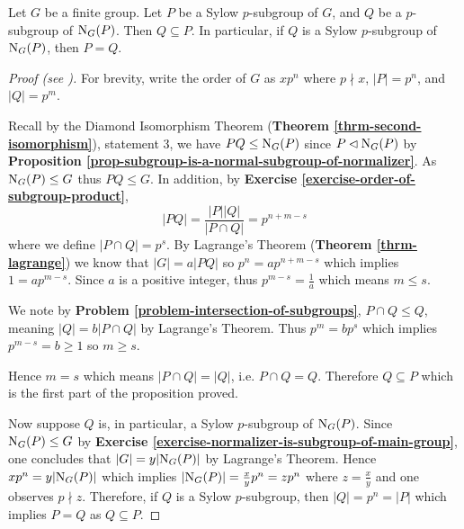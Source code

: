 \begin{proposition}\label{prop-normalizer-of-sylow-p-subgroup}
    Let $G$ be a finite group. Let $P$ be a Sylow $p$-subgroup of $G$, and $Q$ be a $p$-subgroup of $\mathrm{N}_{G}(P)$. Then $Q \subseteq P$. In particular, if $Q$ is a Sylow $p$-subgroup of $\mathrm{N}_{G}(P)$, then $P = Q$.
\end{proposition}
\begin{proof}[Proof (see {\cite[Proposition 11.9]{humphreys_1996}})]
    For brevity, write the order of $G$ as $xp^n$ where $p \nmid x$, $|P| = p^n$, and $|Q| = p^m$.

    Recall by the Diamond Isomorphism Theorem (\textbf{Theorem \ref{thrm-second-isomorphism}}), statement 3, we have $PQ \leq \mathrm{N}_{G}(P)$ since $P \lhd \mathrm{N}_{G}(P)$ by \textbf{Proposition \ref{prop-subgroup-is-a-normal-subgroup-of-normalizer}}. As $\mathrm{N}_{G}(P) \leq G$ thus $PQ \leq G$. In addition, by \textbf{Exercise \ref{exercise-order-of-subgroup-product}},
    \[
        |PQ| = \frac{|P||Q|}{|P \cap Q|} = p^{n+m-s}
    \]
    where we define $|P \cap Q| = p^s$. By Lagrange's Theorem (\textbf{Theorem \ref{thrm-lagrange}}) we know that $|G| = a|PQ|$ so $p^n = ap^{n+m-s}$ which implies $1 = ap^{m-s}$. Since $a$ is a positive integer, thus $p^{m-s} = \frac 1a$ which means $m \leq s$.

    We note by \textbf{Problem \ref{problem-intersection-of-subgroups}}, $P \cap Q \leq Q$, meaning $|Q| = b|P\cap Q|$ by Lagrange's Theorem. Thus $p^m = bp^s$ which implies $p^{m-s} = b \geq 1$ so $m \geq s$.

    Hence $m = s$ which means $|P \cap Q| = |Q|$, i.e. $P \cap Q = Q$. Therefore $Q \subseteq P$ which is the first part of the proposition proved.

    Now suppose $Q$ is, in particular, a Sylow $p$-subgroup of $\mathrm{N}_{G}(P)$. Since $\mathrm{N}_{G}(P) \leq G$ by \textbf{Exercise \ref{exercise-normalizer-is-subgroup-of-main-group}}, one concludes that $|G| = y|\mathrm{N}_{G}(P)|$ by Lagrange's Theorem. Hence $xp^n = y|\mathrm{N}_{G}(P)|$ which implies $|\mathrm{N}_{G}(P)| = \frac{x}{y} p^n = zp^n$ where $z = \frac xy$ and one observes $p \nmid z$. Therefore, if $Q$ is a Sylow $p$-subgroup, then $|Q| = p^n = |P|$ which implies $P = Q$ as $Q \subseteq P$.
\end{proof}

